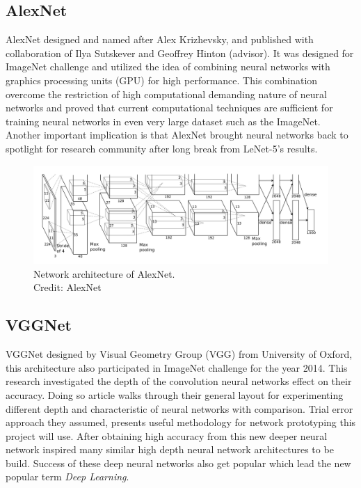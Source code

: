 \documentclass[12pt, twoside, a4paper]{article}
\begin{document}
\subsection{AlexNet}
AlexNet \cite{Alexnet} designed and named after Alex Krizhevsky, and published with collaboration of Ilya Sutskever and Geoffrey Hinton (advisor). It was designed for ImageNet challenge \cite{imagenet} and utilized the idea of combining neural networks with graphics processing units (GPU) for high performance. This combination overcome the restriction of high computational demanding nature of neural networks and proved that current computational techniques are sufficient for training neural networks in even very large dataset such as the ImageNet. Another important implication is that AlexNet brought neural networks back to spotlight for research community after long break from LeNet-5's results. 

\begin{figure}[H]%
    \centering
    \includegraphics[width=\textwidth]{img/alexnet.png}%
    \caption{Network architecture of AlexNet.\\Credit: AlexNet \cite{Alexnet}}%
    \label{fig:alexnet}%
\end{figure}

\subsection{VGGNet}
VGGNet \cite{vggnet} designed by Visual Geometry Group (VGG) from University of Oxford, this architecture also participated in ImageNet challenge \cite{imagenet} for the year 2014. This research investigated the depth of the convolution neural networks effect on their accuracy. Doing so article walks through their general layout for experimenting different depth and characteristic of neural networks with comparison. Trial error approach they assumed, presents useful methodology for network prototyping this project will use. After obtaining high accuracy from this new deeper neural network inspired many similar high depth neural network architectures to be build. Success of these deep neural networks also get popular which lead the new popular term \textit{Deep Learning}.
\clearpage
\end{document}

